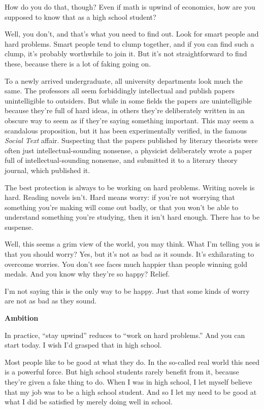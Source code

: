 \documentclass[12pt]{book}
\begin{document}
How do you do that, though? Even if math is upwind of economics, how are
you supposed to know that as a high school student?

Well, you don't, and that's what you need to find out. Look for smart
people and hard problems. Smart people tend to clump together, and if
you can find such a clump, it's probably worthwhile to join it. But it's
not straightforward to find these, because there is a lot of faking
going on.

To a newly arrived undergraduate, all university departments look much
the same. The professors all seem forbiddingly intellectual and publish
papers unintelligible to outsiders. But while in some fields the papers
are unintelligible because they're full of hard ideas, in others they're
deliberately written in an obscure way to seem as if they're saying
something important. This may seem a scandalous proposition, but it has
been experimentally verified, in the famous \emph{Social Text} affair.
Suspecting that the papers published by literary theorists were often
just intellectual-sounding nonsense, a physicist deliberately wrote a
paper full of intellectual-sounding nonsense, and submitted it to a
literary theory journal, which published it.

The best protection is always to be working on hard problems. Writing
novels is hard. Reading novels isn't. Hard means worry: if you're not
worrying that something you're making will come out badly, or that you
won't be able to understand something you're studying, then it isn't
hard enough. There has to be suspense.

Well, this seems a grim view of the world, you may think. What I'm
telling you is that you should worry? Yes, but it's not as bad as it
sounds. It's exhilarating to overcome worries. You don't see faces much
happier than people winning gold medals. And you know why they're so
happy? Relief.

I'm not saying this is the only way to be happy. Just that some kinds of
worry are not as bad as they sound.

\textbf{Ambition}

In practice, ``stay upwind'' reduces to ``work on hard problems.'' And
you can start today. I wish I'd grasped that in high school.

Most people like to be good at what they do. In the so-called real world
this need is a powerful force. But high school students rarely benefit
from it, because they're given a fake thing to do. When I was in high
school, I let myself believe that my job was to be a high school
student. And so I let my need to be good at what I did be satisfied by
merely doing well in school.
\end{document}
